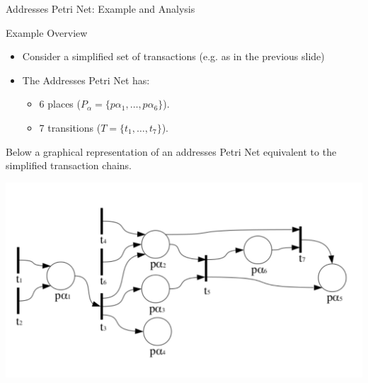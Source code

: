 \documentclass{beamer}
\begin{document}
\begin{frame}{Addresses Petri Net: Example and Analysis}
    \footnotesize
    \vspace{-0.2cm}
    \begin{block}{Example Overview}
        \begin{itemize}
            \item Consider a simplified set of transactions (e.g. as in the previous slide)
            \item The Addresses Petri Net has:
                  \begin{itemize}
                      \item 6 places (\(P_{\alpha} = \{p\alpha_1, \dots, p\alpha_6\}\)).
                      \item 7 transitions (\(T = \{t_1, \dots, t_7\}\)).
                  \end{itemize}
        \end{itemize}
        Below a graphical representation of an addresses Petri Net equivalent to the
        simplified transaction chains.
    \end{block}
    \begin{center}
        \includegraphics[width=0.7\linewidth]{ReteEsempio_1pt}\label{fig:ReteEsempio_1pt}

    \end{center}

\end{frame}
\end{document}
